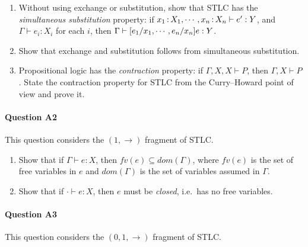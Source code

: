 \documentclass[11pt,a4paper,twoside]{article}
\begin{document}
\begin{enumerate}[label=(\alph*)]
  \item Without using exchange or substitution, show that STLC has the \emph{simultaneous substitution} property: 
  if $x_1 \,{:}\, X_1, \cdots, x_n \,{:}\, X_n \vdash e' : Y$, and $\Gamma \vdash e_i : X_i$ for each $i$,
  then $\Gamma \vdash [e_1 / x_1, \cdots, e_n / x_n] e : Y$.

  \item Show that exchange and substitution follows from simultaneous substitution.

  \item Propositional logic has the \emph{contraction} property:
  if $\Gamma, X, X \vdash P$, then $\Gamma, X \vdash P$.
  State the contraction property for STLC from the Curry--Howard point of view and prove it.
\end{enumerate}

\paragraph{Question A2} This question considers the $(1, \to)$ fragment of STLC.

\begin{enumerate}[label=(\alph*)]
  \item Show that if $\Gamma \vdash e : X$, then $\mathit{fv}(e) \subseteq \mathit{dom}(\Gamma)$,
  where $\mathit{fv}(e)$ is the set of free variables in $e$ 
  and $\mathit{dom}(\Gamma)$ is the set of variables assumed in $\Gamma$.

  \item Show that if $\cdot \vdash e : X$, then $e$ must be \emph{closed}, i.e.~has no free variables.
\end{enumerate}

\paragraph{Question A3} This question considers the $(0, 1, \to)$ fragment of STLC.
\end{document}
